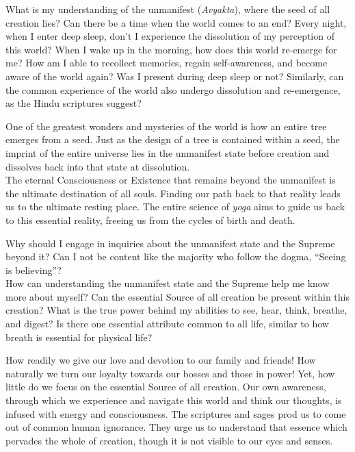 \newpage
\begin{mananam}{}
\normalfont\mananamtext What is my understanding of the unmanifest (\emph{Avyakta}), where the seed of all creation lies? Can there be a time when the world comes to an end? Every night, when I enter deep sleep, don’t I experience the dissolution of my perception of this world? When I wake up in the morning, how does this world re-emerge for me? How am I able to recollect memories, regain self-awareness, and become aware of the world again? Was I present during deep sleep or not? Similarly, can the common experience of the world also undergo dissolution and re-emergence, as the Hindu scriptures suggest?
\end{mananam}
\sreflect
\begin{inspiration}{}
\normalfont\mananamtext One of the greatest wonders and mysteries of the world is how an entire tree emerges from a seed. Just as the design of a tree is contained within a seed, the imprint of the entire universe lies in the unmanifest state before creation and dissolves back into that state at dissolution. \\
The eternal Consciousness or Existence that remains beyond the unmanifest is the ultimate destination of all souls. Finding our path back to that reality leads us to the ultimate resting place. The entire science of \emph{yoga} aims to guide us back to this essential reality, freeing us from the cycles of birth and death.
\end{inspiration}
\newpage
\begin{mananam}{}
\normalfont\mananamtext Why should I engage in inquiries about the unmanifest state and the Supreme beyond it? Can I not be content like the majority who follow the dogma, “Seeing is believing”?\\
How can understanding the unmanifest state and the Supreme help me know more about myself? Can the essential Source of all creation be present within this creation? What is the true power behind my abilities to see, hear, think, breathe, and digest? Is there one essential attribute common to all life, similar to how breath is essential for physical life?
\end{mananam}
\sreflect
\begin{inspiration}{}
\normalfont\mananamtext How readily we give our love and devotion to our family and friends! How naturally we turn our loyalty towards our bosses and those in power! Yet, how little do we focus on the essential Source of all creation. Our own awareness, through which we experience and navigate this world and think our thoughts, is infused with energy and consciousness. The scriptures and sages prod us to come out of common human ignorance. They urge us to understand that essence which pervades the whole of creation, though it is not visible to our eyes and senses. 
\end{inspiration}
\newpage

